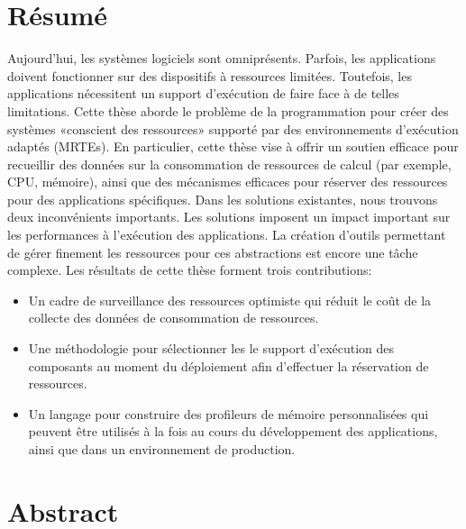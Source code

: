 \pagestyle{empty}
\vspace{-2cm}
\section*{Résumé}
Aujourd'hui, les syst\`emes logiciels sont omnipr\'esents.
Parfois, les applications doivent fonctionner sur des dispositifs à ressources limit\'ees.
Toutefois, les applications nécessitent un support d'exécution de faire face à de telles limitations. 
Cette thèse aborde le problème de la programmation pour créer des systèmes «conscient des ressources» supporté par des environnements d'exécution adaptés (MRTEs).
En particulier, cette thèse vise à offrir un soutien efficace pour recueillir des données sur la consommation de ressources de calcul (par exemple, CPU, mémoire), ainsi que des mécanismes efficaces pour réserver des ressources pour des applications spécifiques.
Dans les solutions existantes, nous trouvons deux inconvénients importants.
Les solutions imposent un impact important sur les performances à l'exécution des applications.
La création d'outils permettant de gérer finement les ressources pour ces abstractions est encore une tâche complexe.
Les résultats de cette thèse forment trois contributions:
\begin{itemize}
\item Un cadre de surveillance des ressources optimiste qui réduit le coût de la collecte des données de consommation de ressources.

\item Une méthodologie pour sélectionner les le support d’exécution des composants au moment du déploiement afin d'effectuer la réservation de ressources.

\item Un langage pour construire des profileurs de mémoire personnalisées qui peuvent être utilisés à la fois au cours du développement des applications, ainsi que dans un environnement de production.
\end{itemize}

\section*{Abstract}

